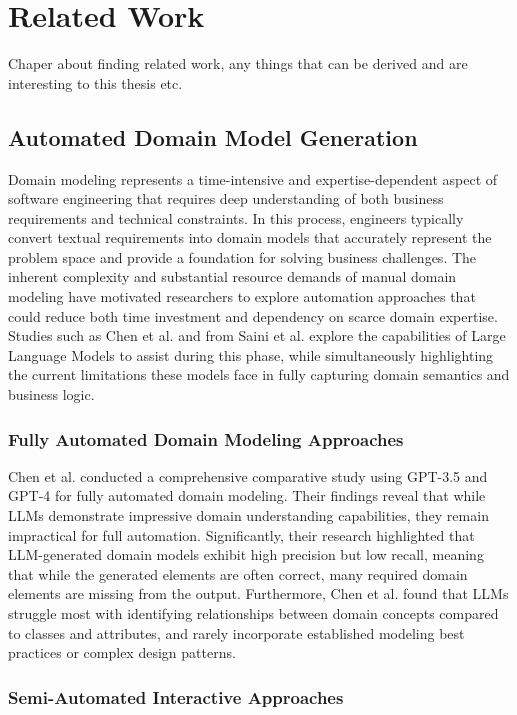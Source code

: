 \chapter{Related Work}
Chaper about finding related work, any things that can be derived and are interesting to this thesis etc.
\section{Automated Domain Model Generation}\label{admg}
Domain modeling represents a time-intensive and expertise-dependent aspect of software engineering that requires deep understanding of both business requirements and technical constraints. In this process, engineers typically convert textual requirements into domain models that accurately represent the problem space and provide a foundation for solving business challenges. The inherent complexity and substantial resource demands of manual domain modeling have motivated researchers to explore automation approaches that could reduce both time investment and dependency on scarce domain expertise. Studies such as Chen et al. \autocite{chen2023automated} and from Saini et al. \autocite{Saini2022} explore the capabilities of Large Language Models to assist during this phase, while simultaneously highlighting the current limitations these models face in fully capturing domain semantics and business logic. 

\subsection{Fully Automated Domain Modeling Approaches}

Chen et al. \autocite{chen2023automated} conducted a comprehensive comparative study using GPT-3.5 and GPT-4 for fully automated domain modeling. Their findings reveal that while LLMs demonstrate impressive domain understanding capabilities, they remain impractical for full automation. Significantly, their research highlighted that LLM-generated domain models exhibit high precision but low recall, meaning that while the generated elements are often correct, many required domain elements are missing from the output. Furthermore, Chen et al. found that LLMs struggle most with identifying relationships between domain concepts compared to classes and attributes, and rarely incorporate established modeling best practices or complex design patterns.

\subsection{Semi-Automated Interactive Approaches}


